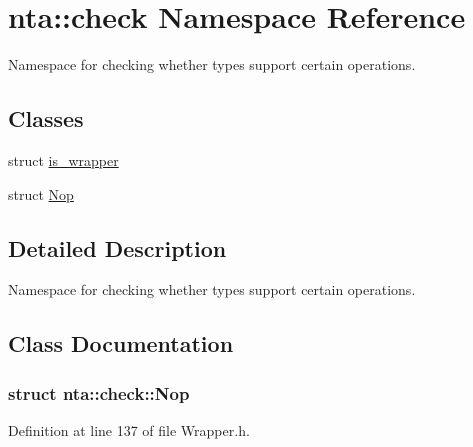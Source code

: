 \hypertarget{namespacenta_1_1check}{}\section{nta\+:\+:check Namespace Reference}
\label{namespacenta_1_1check}


Namespace for checking whether types support certain operations.  


\subsection*{Classes}
\begin{DoxyCompactItemize}
\item 
struct \hyperlink{structnta_1_1check_1_1is__wrapper}{is\+\_\+wrapper}
\item 
struct \hyperlink{namespacenta_1_1check_de/d20/structnta_1_1check_1_1Nop}{Nop}
\end{DoxyCompactItemize}


\subsection{Detailed Description}
Namespace for checking whether types support certain operations. 

\subsection{Class Documentation}
\label{structnta_1_1check_1_1Nop}
\subsubsection{struct nta\+:\+:check\+:\+:Nop}


Definition at line 137 of file Wrapper.\+h.

